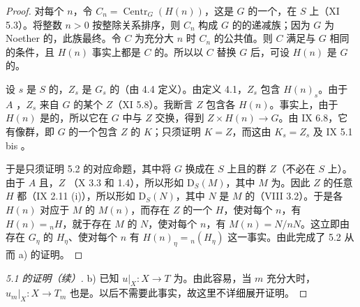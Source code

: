 \begin{proof}
对每个 $n$，令 $C_n=\operatorname{Centr}_G(H(n))$，这是 $G$ 的一个，在 $S$ 上（XI 5.3）。将整数 $n>0$ 按整除关系排序，则 $C_n$ 构成 $G$ 的的递减族；因为 $G$ 为 Noether 的，此族最终。令 $C$ 为充分大 $n$ 时 $C_n$ 的公共值。则 $C$ 满足与 $G$ 相同的条件，且 $H(n)$ 事实上都是 $C$ 的。所以以 $C$ 替换 $G$ 后，可设 $H(n)$ 是 $G$ 的。

设 $s$ 是 $S$ 的，$Z_s$ 是 $G_s$ 的（由 4.4 定义）。由定义 4.1，$Z_s$ 包含 $H(n)_s$。由于 $A$ ，$Z_s$ 来自 $G$ 的某个 $Z$（XI 5.8）。我断言 $Z$ 包含各 $H(n)$。事实上，由于 $H(n)$ 是的，所以它在 $G$ 中与 $Z$ 交换，得到 $Z\times H(n)\to G$。由 IX 6.8，它有像群，即 $G$ 的一个包含 $Z$ 的 $K$；只须证明 $K=Z$，而这由 $K_s=Z_s$ 及 IX 5.1 bis 。

于是只须证明 5.2 的对应命题，其中将 $G$ 换成在 $S$ 上且的群 $Z$（不必在 $S$ 上）。由于 $A$ 且，$Z$ （X 3.3 和 1.4），所以形如 $\mathrm D_S(M)$，其中 $M$ 为。因此 $Z$ 的任意 $H$ 都（IX 2.11 (i)），所以形如 $\mathrm D_S(N)$，其中 $N$ 是 $M$ 的（VIII 3.2）。于是各 $H(n)$ 对应于 $M$ 的 $M(n)$，而存在 $Z$ 的一个
$H$，使对每个 $n$，有 $H(n)={}_nH$，就于存在 $M$ 的 $N$，使对每个 $n$，有 $M(n)=N/nN$。这立即由存在 $G_\eta$ 的 $H_\eta$、使对每个 $n$ 有 $H(n)_\eta={}_n(H_\eta)$ 这一事实。由此完成了 5.2 从而 a) 的证明。
\end{proof}
\begin{proof}[ 5.1 的证明（续）]
b) 已知 $u|_X:X\to T$ 为。由此容易，当 $m$ 充分大时， $u_m|_X:X\to T_m$ 也是。以后不需要此事实，故这里不详细展开证明。
\end{proof}
